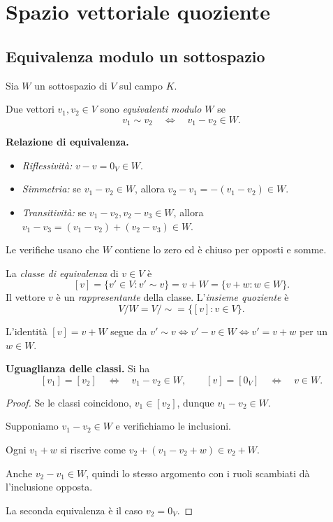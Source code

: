 
\section{Spazio vettoriale quoziente}

\subsection{Equivalenza modulo un sottospazio}

Sia $W$ un sottospazio di $V$ sul campo $K$.
\begin{definizione}
Due vettori $v_1,v_2\in V$ sono \emph{equivalenti modulo $W$} se
\[
  v_1\sim v_2\quad\Longleftrightarrow\quad v_1-v_2\in W.
\]
\end{definizione}

\textbf{Relazione di equivalenza.}
\begin{itemize}
  \item \emph{Riflessività:} $v-v=0_V\in W$.
  \item \emph{Simmetria:} se $v_1-v_2\in W$, allora $v_2-v_1=-(v_1-v_2)\in W$.
  \item \emph{Transitività:} se $v_1-v_2,v_2-v_3\in W$, allora $v_1-v_3=(v_1-v_2)+(v_2-v_3)\in W$.
\end{itemize}
Le verifiche usano che $W$ contiene lo zero ed è chiuso per opposti e somme.

\begin{definizione}
La \emph{classe di equivalenza} di $v\in V$ è
\[
  [v]=\{v'\in V:v'\sim v\}=v+W=\{v+w:w\in W\}.
\]
Il vettore $v$ è un \emph{rappresentante} della classe. L'\emph{insieme quoziente} è
\[
  V/W=V/{\sim}=\{[v]:v\in V\}.
\]
\end{definizione}

L'identità $[v]=v+W$ segue da $v'\sim v\iff v'-v\in W\iff v'=v+w$ per un $w\in W$.

\textbf{Uguaglianza delle classi.} Si ha
\[
  [v_1]=[v_2]\quad\Longleftrightarrow\quad v_1-v_2\in W,
  \qquad [v]=[0_V]\quad\Longleftrightarrow\quad v\in W.
\]
\begin{proof}
\passomath{\Rightarrow} Se le classi coincidono, $v_1\in[v_2]$, dunque $v_1-v_2\in W$.

\passomath{\Leftarrow} Supponiamo $v_1-v_2\in W$ e verifichiamo le inclusioni.

\passomath{[v_1]\subseteq[v_2]} Ogni $v_1+w$ si riscrive come $v_2+(v_1-v_2+w)\in v_2+W$.

\passomath{[v_2]\subseteq[v_1]} Anche $v_2-v_1\in W$, quindi lo stesso argomento con i ruoli scambiati dà l'inclusione opposta.

La seconda equivalenza è il caso $v_2=0_V$.
\end{proof}

